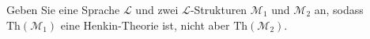 
\begin{exercise}[139]

Geben Sie eine Sprache $\mathscr{L}$ und zwei $\mathscr{L}$-Strukturen $\mathscr{M}_1$
und $\mathscr{M}_2$ an, sodass $\mathrm{Th}(\mathscr{M}_1)$ eine Henkin-Theorie ist,
nicht aber $\mathrm{Th}(\mathscr{M}_2)$.

\end{exercise}


\begin{solution}

\phantom{}

\end{solution}

